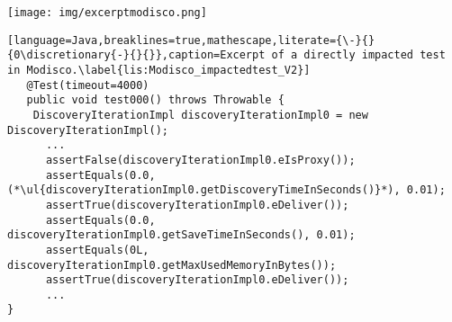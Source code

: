 
\begin{figure*}[tb]
\centering
\texttt{[image: img/excerptmodisco.png]}

\caption{Excerpt of Modisco Benchmark metamodel in version 0.9.0.}
\label{fig:excerptmodisco}
\end{figure*}


\begin{comment}

\begin{lstlisting}[language=Java,breaklines=true,mathescape,literate={\-}{}{0\discretionary{-}{}{}},caption=Excerpt of an impacted test in Modisco V1.\label{lis:Modisco_impactedtest_V1}]
   @Test(timeout=4000) public void test000() throws Throwable {
   
      DiscoveryImpl discoveryImpl0=new DiscoveryImpl();
      ...
      assertEquals(0L,discoveryImpl0.getMaxUsedMemoryInBytes());
      assertNull(discoveryImpl0.getAlgorithmVariant()); assertEquals(0.0, (*\ul{discoveryImpl0.getTotalExecutionTimeInSeconds()}*),0.01);
      assertEquals(4,EObjectImpl.ELAST_EOBJECT_FLAG);
      assertTrue(discoveryImpl0.eDeliver());
      assertEquals(0.0, (*\ul{discoveryImpl0.getSaveTimeInSeconds()}*),0.01);
      ...
}
    
    
\end{lstlisting}
\end{comment}



\begin{lstlisting}[language=Java,breaklines=true,mathescape,literate={\-}{}{0\discretionary{-}{}{}},caption=Excerpt of a directly impacted test in Modisco.\label{lis:Modisco_impactedtest_V2}]
   @Test(timeout=4000)
   public void test000() throws Throwable {
    DiscoveryIterationImpl discoveryIterationImpl0 = new DiscoveryIterationImpl();
      ...
      assertFalse(discoveryIterationImpl0.eIsProxy());
      assertEquals(0.0,  (*\ul{discoveryIterationImpl0.getDiscoveryTimeInSeconds()}*), 0.01);
      assertTrue(discoveryIterationImpl0.eDeliver());
      assertEquals(0.0, discoveryIterationImpl0.getSaveTimeInSeconds(), 0.01);
      assertEquals(0L, discoveryIterationImpl0.getMaxUsedMemoryInBytes());
      assertTrue(discoveryIterationImpl0.eDeliver());
      ...
}
    
    
\end{lstlisting}

